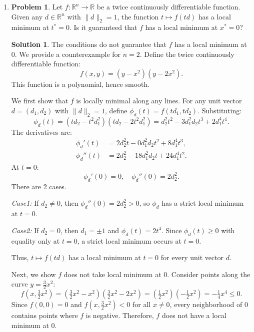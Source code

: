 \documentclass[12pt]{article}
\theoremstyle{definition}
\newtheorem*{solution}{\normalfont\textbf{Solution}}
\newtheorem*{Problem}{\noindent\textbf{Problem}}
\begin{document}
\begin{enumerate}[leftmargin=*]
    \item \begin{Problem}
            Let \( f : \mathbb{R}^n \to \mathbb{R} \) be a twice continuously differentiable function. Given any \( d \in \mathbb{R}^n \) with \( \|d\|_2 = 1 \), the function \( t \mapsto f(td) \) has a local minimum at \( t^* = 0 \). Is it guaranteed that \( f \) has a local minimum at \( x^* = 0 \)?
        \end{Problem}
        \begin{solution}
            The conditions do not guarantee that \( f \) has a local minimum at \( 0 \). We provide a counterexample for \( n = 2 \). Define the twice continuously differentiable function:
            \[
            f(x, y) = (y - x^2)(y - 2x^2).
            \]
            This function is a polynomial, hence smooth. 

            We first show that \(f\) is locally minimal along any lines.
            For any unit vector \( d = (d_1, d_2) \) with \( \|d\|_2 = 1 \), define \( \phi_{d}(t) = f(td_1, td_2) \). Substituting:
            \[
            \phi_{d}(t) = (td_2 - t^2d_1^2)(td_2 - 2t^2d_1^2) = d_2^2t^2 - 3d_1^2d_2t^3 + 2d_1^4t^4.
            \]
            The derivatives are:
            \begin{align*}
            \phi_{d}'(t) &= 2d_2^2t - 0d_1^2d_2t^2 + 8d_1^4t^3, \\
            \phi_{d}''(t) &= 2d_2^2 - 18d_1^2d_2t + 24d_1^4t^2.
            \end{align*}
            At \( t = 0 \):
            \[
            \phi_{d}'(0) = 0, \quad \phi_{d}''(0) = 2d_2^2.
            \]
            There are 2 cases.
            
            \textit{Case1:} If \( d_2 \neq 0 \), then \( \phi_{d}''(0) = 2d_2^2 > 0 \), so \( \phi_{d} \) has a strict local minimum at \( t = 0 \).
                
            \textit{Case2:} If \( d_2 = 0 \), then \( d_1 = \pm 1 \) and \( \phi_{d}(t) = 2t^4 \). Since \( \phi_{d}(t) \geq 0 \) with equality only at \( t = 0 \), a strict local minimum occurs at \( t = 0 \).
            
            Thus, \( t \mapsto f(td) \) has a local minimum at \( t = 0 \) for every unit vector \( d \).

            Next, we show \(f\) does not take local minimum at \( 0 \).  
            Consider points along the curve \( y = \frac{3}{2}x^2 \):
            \[
            f\left(x, \tfrac{3}{2}x^2\right) = \left(\tfrac{3}{2}x^2 - x^2\right)\left(\tfrac{3}{2}x^2 - 2x^2\right) = \left(\tfrac{1}{2}x^2\right)\left(-\tfrac{1}{2}x^2\right) = -\tfrac{1}{4}x^4 \leq 0.
            \]
            Since \( f(0,0) = 0 \) and \( f\left(x, \frac{3}{2}x^2\right) < 0 \) for all \( x \neq 0 \), every neighborhood of \( 0 \) contains points where \( f \) is negative. Therefore, \( f \) does not have a local minimum at \( 0 \).


\end{solution}
\end{enumerate}
\end{document}
